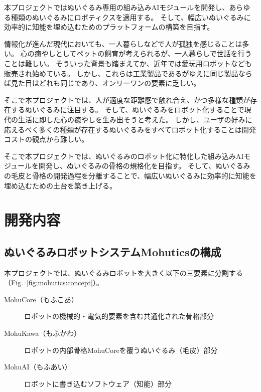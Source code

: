 \documentclass[uplatex,a4paper,12pt]{jsarticle}
\renewcommand{\figurename}{Fig.}
\newcommand{\figref}[1]{\figurename~\ref{#1}}
\begin{document}


本プロジェクトではぬいぐるみ専用の組み込みAIモジュールを開発し、あらゆる種類のぬいぐるみにロボティクスを適用する。
そして、幅広いぬいぐるみに効率的に知能を埋め込むためのプラットフォームの構築を目指す。

情報化が進んだ現代においても、一人暮らしなどで人が孤独を感じることは多い。
心の癒やしとしてペットの飼育が考えられるが、一人暮らしで世話を行うことは難しい。
そういった背景も踏まえてか、近年では愛玩用ロボットなども販売され始めている。
しかし、これらは工業製品であるがゆえに同じ製品ならば見た目はどれも同じであり、オンリーワンの要素に乏しい。

そこで本プロジェクトでは、人が適度な距離感で触れ合え、かつ多様な種類が存在するぬいぐるみに注目する。
そして、ぬいぐるみをロボット化することで現代の生活に即した心の癒やしを生み出そうと考えた。
しかし、ユーザの好みに応えるべく多くの種類が存在するぬいぐるみをすべてロボット化することは開発コストの観点から難しい。

そこで本プロジェクトでは、ぬいぐるみのロボット化に特化した組み込みAIモジュールを開発し、ぬいぐるみの骨格の規格化を目指す。
そして、ぬいぐるみの毛皮と骨格の開発過程を分離することで、幅広いぬいぐるみに効率的に知能を埋め込むための土台を築き上げる。

\section{開発内容}
\subsection{ぬいぐるみロボットシステムMohuticsの構成}
本プロジェクトでは、ぬいぐるみロボットを大きく以下の三要素に分割する（\figref{fig:mohutics:concept}）。
\begin{description}
  \item[MohuCore（もふこあ）] ロボットの機械的・電気的要素を含む共通化された骨格部分
  \item[MohuKawa（もふかわ）] ロボットの内部骨格MohuCoreを覆うぬいぐるみ（毛皮）部分
  \item[MohuAI（もふあい）] ロボットに書き込むソフトウェア（知能）部分
\end{description}
\end{document}
